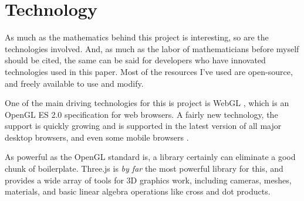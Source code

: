 \section{Technology}

As much as the mathematics behind this project is interesting, so are the technologies involved. And, as much as the
labor of mathematicians before myself should be cited, the same can be said for developers who have innovated
technologies used in this paper. Most of the resources I've used are open-source, and freely available to use and
modify.

One of the main driving technologies for this is project is WebGL \cite{webgl}, which is an OpenGL ES 2.0 specification
for web browsers. A fairly new technology, the support is quickly growing and is supported in the latest version of
all major desktop browsers, and even some mobile browsers \cite{caniuse_webgl}.

As powerful as the OpenGL standard is, a library certainly can eliminate a good chunk of boilerplate. Three.js
\cite{threejs} is \emph{by far} the most powerful library for this, and provides a wide array of tools for 3D
graphics work, including cameras, meshes, materials, and basic linear algebra operations like cross and dot products.
